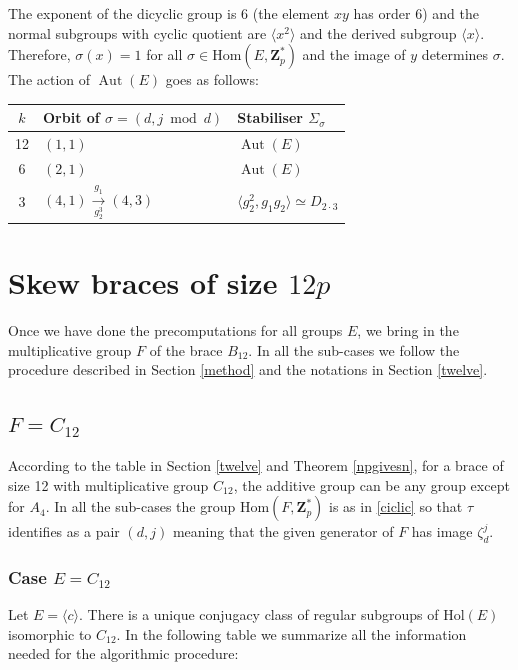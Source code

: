 \documentclass[12pt]{article}
\theoremstyle{definition}
\newcommand{\Z}{\mathbf Z}
\newcommand{\Hol}{\mathrm{Hol}}
\newcommand{\Hom}{\mathrm{Hom}}
\newcommand{\Aut}{\operatorname{Aut}}
\begin{document}
	The exponent of the dicyclic group is $6$ (the element $xy$ has order $6$)
	and the normal subgroups with cyclic quotient are $\langle x^2\rangle$ and the derived subgroup $\langle x\rangle$. Therefore, $\sigma(x)=1$ for all
	$\sigma\in \Hom(E,\Z_p^*)$ and the image of $y$ determines $\sigma$. The action of $\Aut(E)$ goes as follows:
	\begin{center}
		\begin{tabular}{c|l|l}
			$k$  & Orbit of $\sigma=(d,j\bmod d)$& Stabiliser $\Sigma_{\sigma}$ \\
			\hline
			12  & $(1,1)$   & $\Aut(E)$\\
			6& $(2,1)$   & $\Aut(E)$\\
			3&  $(4,1)\xrightarrow[g_2^3]{g_1}(4,3)$   & $\langle g_2^2, g_1g_2\rangle\simeq D_{2\cdot 3}$\\
		\end{tabular}
	\end{center}
	
	
	
	
	\section{Skew braces of size $12p$}\label{braces12p}
	
	Once we have done the precomputations for all groups $E$, we bring in the multiplicative group $F$ of the brace $B_{12}$.
	In all the sub-cases we follow the procedure described in Section \ref{method} and the notations in Section \ref{twelve}. 
	
	
	\subsection{$F=C_{12}$}
	
	According to the table in Section \ref{twelve} and Theorem \ref{npgivesn}, for a brace of size 12 with multiplicative group  $C_{12}$, the additive group can
	be any group except for $A_4$. In all the sub-cases the group $\Hom(F,\Z_p^*)$ is as in \ref{ciclic} so that
	$\tau$ identifies as a pair $(d,j)$ meaning that the given generator of $F$ has image $\zeta_d^j.$
	
	
	
	
	\subsubsection*{Case $E=C_{12}$}
	
	Let $E=\langle c\rangle$. There is a unique conjugacy class of regular subgroups of $\Hol(E)$ isomorphic to $C_{12}$. In the following table we summarize all the information needed for the algorithmic procedure:
\end{document}

